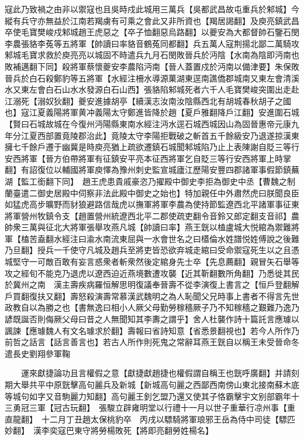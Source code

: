 寇此乃致禍之由非以禦寇也且吳時戍此城用三萬兵【吳都武昌故屯重兵於邾城】今縱有兵守亦無益於江南若羯虜有可乘之會此又非所資也【羯居謁翻】及庾亮鎮武昌卒使毛寶樊峻戍邾城趙王虎惡之【卒子恤翻惡烏路翻】以夔安為大都督帥石鑒石閔李農張貉李菟等五將軍【帥讀曰率貉音鶴菟同都翻】兵五萬人寇荆揚北鄙二萬騎攻邾城毛寶求救於庾亮亮以城固不時遣兵九月石閔敗晉兵於沔陰【水南為陰即沔南也敗補邁翻下同】殺將軍蔡懷夔安李農陷沔南【晉人蓋置戍於沔南以備津要】朱保敗晉兵於白石殺鄭豹等五將軍【水經注柵水導源菓湖東逕南譙僑郡城南又東左會清溪水又東左會白石山水水發源白石山西】張貉陷邾城死者六千人毛寶樊峻突圍出走赴江溺死【溺奴狄翻】夔安進據胡亭【續漢志汝南汝陰縣西北有胡城春秋胡子之國也】寇江夏義陽將軍黄冲義陽太守鄭進皆降於趙【夏戶雅翻降戶江翻】安進圍石城【賢曰石城故城在今復州沔陽縣東南水經注沔水逕石城西城因山為固晉惠帝元康九年分江夏西部置竟陵郡治此】竟陵太守李陽拒戰破之斬首五千餘級安乃退遂掠漢東擁七千餘戶遷于幽冀是時庾亮猶上疏欲遷鎮石城聞邾城陷乃止上表陳謝自貶三等行安西將軍【晉方伯帶將軍有征鎮安平亮本征西將軍乞自貶三等行安西將軍上時掌翻】有詔復位以輔國將軍庾懌為豫州刺史監宣城廬江歷陽安豐四郡諸軍事假節鎮蕪湖【監工銜翻下同】　趙王虎患貴戚豪恣乃擢殿中御史李拒為御史中丞【曹魏之制蘭臺遣二御史居殿中伺察非法此殿中御史之始也】特加親任中外肅然虎曰朕聞良臣如猛虎高步曠野而豺狼避路信哉虎以撫軍將軍李農為使持節監遼西北平諸軍事征東將軍營州牧鎮令支【趙置營州統遼西北平二郡使疏吏翻令音鈴又郎定翻支音祁】農帥衆三萬與征北大將軍張舉攻燕凡城【帥讀曰率】燕王皝以榼盧城大悦綰為禦難將軍【榼苦盍翻水經注曰渝水南流東屈與一水會世名之曰㯼倫水姓譜悦姓傅說之後難乃旦翻】授兵一千使守凡城及趙兵至將吏皆恐欲弃城走綰曰受命禦寇死生以之且憑城堅守一可敵百敢有妄言惑衆者斬衆然後定綰身先士卒【先息薦翻】親冒矢石舉等攻之經旬不能克乃退虎以遼西迫近燕境數遭攻襲【近其靳翻數所角翻】乃悉徙其民於冀州之南　漢主壽疾病羅恒解思明復議奉晉壽不從李演復上書言之【恒戶登翻解戶買翻復扶又翻】壽怒殺演壽常慕漢武魏明之為人恥聞父兄時事上書者不得言先世政教自以為勝之也【書無逸曰相小人厥父母勤勞稼穡厥子乃不知稼穡之艱難乃逸乃諺既誕否則侮厥父母曰昔之人無聞知其李夀之謂乎】舍人杜襲作詩十篇託言應璩以諷諫【應璩魏人有文名璩求於翻】壽報曰省詩知意【省悉景翻視也】若今人所作乃前哲之話言【話言善言也】若古人所作則死鬼之常辭耳燕王皝自以稱王未受晉命冬遣長史劉翔參軍鞠

　　運來獻捷論功且言權假之意【獻捷獻趙捷也權假謂自稱王也皝呼廣翻】并請刻期大舉共平中原皝擊高句麗兵及新城【新城高句麗之西鄙西南傍山東北接南蘇木底等城句如字又音駒麗力知翻】高句麗王釗乞盟乃還又使其子恪霸擊宇文别部霸年十三勇冠三軍【冠古玩翻】　張駿立辟雍明堂以行禮十一月以世子重華行凉州事【重直龍翻】　十二月丁丑趙太保桃豹卒　丙戌以驃騎將軍琅邪王岳為侍中司徒【驃匹妙翻】　漢李奕寇巴東守將勞楊敗死【將即亮翻勞姓楊名】

